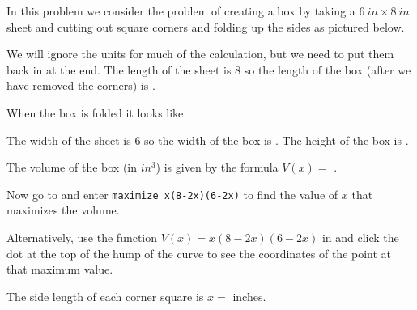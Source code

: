 \documentclass{ximera}
\begin{document}
\begin{question}
In this problem we consider the problem of creating a box by taking a $\SI{6}{in}\times\SI{8}{in}$ sheet and cutting out square corners and folding up the sides as pictured below.
\begin{image}
\end{image}
\begin{solution}
We will ignore the units for much of the calculation, but we need to put them back in at the end. The length of the sheet is $8$ so the length of the box (after we have removed the corners) is .
\begin{hint}
When the box is folded it looks like
\begin{image}
\end{image}
\end{hint}
The width of the sheet is $6$ so the width of the box is . The height of the box is .

The volume of the box (in $\si{in^3}$) is given by the formula $V(x)=$ .

Now go to  and enter \texttt{maximize x(8-2x)(6-2x)} to find the value of $x$ that maximizes the volume. 

Alternatively, use the function $V(x)=x(8-2x)(6-2x)$ in  and click the dot at the top of the hump of the curve to see the coordinates of the point at that maximum value.

The side length of each corner square is  $x=$  inches.
\end{solution}
\end{question}
\end{document}
